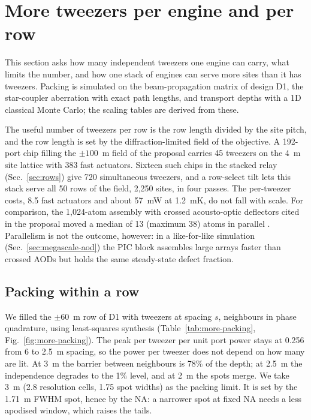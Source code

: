 \section{More tweezers per engine and per row}\label{sec:moretweezers}

This section asks how many independent tweezers one engine can carry, what limits the number, and how one
stack of engines can serve more sites than it has tweezers. Packing is simulated on the beam-propagation matrix
of design D1, the star-coupler aberration with exact path lengths, and transport depths with a 1D classical
Monte Carlo; the scaling tables are derived from these.

The useful number of tweezers per row is the row length divided by the site pitch, and the row length is set
by the diffraction-limited field of the objective. A 192-port chip filling the $\pm100$~\textmu m field of the
proposal carries 45 tweezers on the 4~\textmu m site lattice with 383 fast actuators. Sixteen such chips in the
stacked relay (Sec.~\ref{sec:rows}) give 720 simultaneous tweezers, and a row-select tilt lets this stack serve
all 50 rows of the field, 2,250 sites, in four passes. The per-tweezer costs, 8.5 fast actuators and about
57~mW at 1.2~mK, do not fall with scale. For comparison, the 1,024-atom assembly with crossed acousto-optic
deflectors cited in the proposal moved a median of 13 (maximum 38) atoms in parallel \cite{proposal}. Parallelism is
not the outcome, however: in a like-for-like simulation (Sec.~\ref{sec:megascale-aod}) the PIC block assembles large
arrays faster than crossed AODs but holds the same steady-state defect fraction.

\subsection{Packing within a row}\label{sec:moretweezers-packing}

We filled the $\pm60$~\textmu m row of D1 with tweezers at spacing $s$, neighbours in phase quadrature, using
least-squares synthesis (Table~\ref{tab:more-packing}, Fig.~\ref{fig:more-packing}). The peak per tweezer per
unit port power stays at 0.256 from 6 to 2.5~\textmu m spacing, so the power per tweezer does not depend on how
many are lit. At 3~\textmu m the barrier between neighbours is 78\% of the depth; at 2.5~\textmu m the
independence degrades to the 1\% level, and at 2~\textmu m the spots merge. We take 3~\textmu m (2.8
resolution cells, 1.75 spot widths) as the packing limit. It is set by the 1.71~\textmu m FWHM spot, hence by the
NA: a narrower spot at fixed NA needs a less apodised window, which raises the tails.

